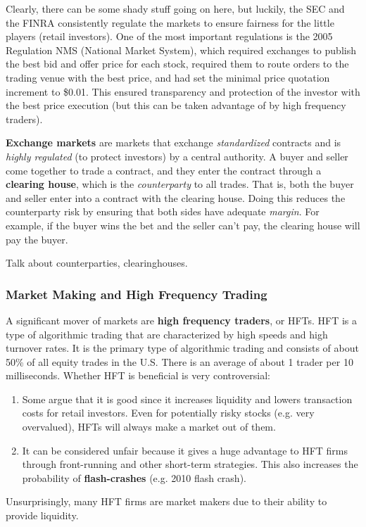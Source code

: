 \documentclass{article}
\begin{document}
    Clearly, there can be some shady stuff going on here, but luckily, the SEC and the FINRA consistently regulate the markets to ensure fairness for the little players (retail investors). One of the most important regulations is the 2005 Regulation NMS (National Market System), which required exchanges to publish the best bid and offer price for each stock, required them to route orders to the trading venue with the best price, and had set the minimal price quotation increment to \$0.01. This ensured transparency and protection of the investor with the best price execution (but this can be taken advantage of by high frequency traders). 

    \begin{definition}
      \textbf{Exchange markets} are markets that exchange \textit{standardized} contracts and is \textit{highly regulated} (to protect investors) by a central authority. A buyer and seller come together to trade a contract, and they enter the contract through a \textbf{clearing house}, which is the \textit{counterparty} to all trades. That is, both the buyer and seller enter into a contract with the clearing house. Doing this reduces the counterparty risk by ensuring that both sides have adequate \textit{margin}. For example, if the buyer wins the bet and the seller can't pay, the clearing house will pay the buyer.
    \end{definition}

    \begin{question}
      Talk about counterparties, clearinghouses. 
    \end{question}

    \subsubsection{Market Making and High Frequency Trading}

      A significant mover of markets are \textbf{high frequency traders}, or HFTs. HFT is a type of algorithmic trading that are characterized by high speeds and high turnover rates. It is the primary type of algorithmic trading and consists of about 50\% of all equity trades in the U.S. There is an average of about 1 trader per 10 milliseconds. Whether HFT is beneficial is very controversial: 
      \begin{enumerate}
          \item Some argue that it is good since it increases liquidity and lowers transaction costs for retail investors. Even for potentially risky stocks (e.g. very overvalued), HFTs will always make a market out of them. 
          \item It can be considered unfair because it gives a huge advantage to HFT firms through front-running and other short-term strategies. This also increases the probability of \textbf{flash-crashes} (e.g. 2010 flash crash). 
      \end{enumerate}
      Unsurprisingly, many HFT firms are market makers due to their ability to provide liquidity. 
\end{document}
